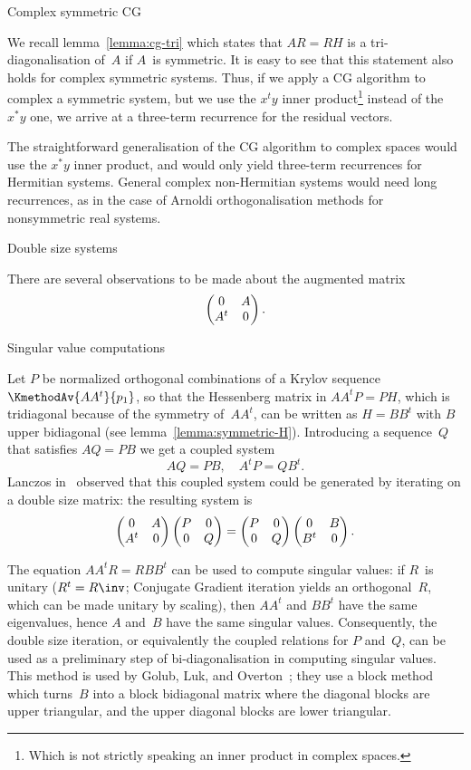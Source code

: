 \documentclass[11pt]{artikel3}
\begin{document}
\begin{Outline}
 {Complex symmetric CG}

We recall lemma~\ref{lemma:cg-tri} which states that $AR=RH$ is a
tri-diagonalisation of~$A$ if $A$~is symmetric. It is easy to see that
this statement also holds for complex symmetric systems. Thus, if we
apply a CG algorithm to complex a symmetric system, but we use the
$x^ty$ inner product\footnote{Which is not strictly speaking an inner
product in complex spaces.} instead of the $x^*y$ one, we arrive at a
three-term recurrence for the residual vectors. 

The straightforward generalisation of the CG algorithm to complex
spaces would use the $x^*y$ inner product, and would only yield
three-term recurrences for Hermitian systems. General complex
non-Hermitian systems would need long recurrences, as in the case of
Arnoldi orthogonalisation methods for nonsymmetric real systems.

 {Double size systems}

There are several observations to be made about the augmented matrix 
\[\begin{pmatrix}0&A\cr A^t&0\end{pmatrix}.\]

 {Singular value computations}\label{sec:svd}

Let $P$ be normalized orthogonal combinations of a Krylov sequence
$\KmethodAv{AA^t}{p_1}$, so that the Hessenberg matrix in
$AA^tP=PH$, which is tridiagonal because of the symmetry of~$AA^t$,
can be written as $H=BB^t$ with $B$ upper bidiagonal (see
lemma~\ref{lemma:symmetric-H}). Introducing a sequence~$Q$ that
satisfies $AQ=PB$ we get a coupled system
\[ AQ=PB,\quad A^tP=QB^t. \]
Lanczos in~\cite{La:differential-book} observed that this coupled
system could be generated by iterating on a double size matrix:
the resulting system is 
\[ \begin{pmatrix}0&A\cr A^t&0\end{pmatrix}\begin{pmatrix}P&0\cr 0&Q\end{pmatrix}=
    \begin{pmatrix}P&0\cr 0&Q\end{pmatrix}\begin{pmatrix}0&B\cr B^t&0\end{pmatrix}.\]

The equation $AA^tR=RBB^t$ can be used to compute singular values: if
$R$~is unitary ($R^t=R\inv$; Conjugate Gradient iteration yields an
orthogonal~$R$, which can be made unitary by scaling), then $AA^t$ and
$BB^t$ have the same eigenvalues, hence $A$ and~$B$ have the same
singular values.  Consequently, the double size iteration, or
equivalently the coupled relations for $P$ and~$Q$, can be used as a
preliminary step of bi-diagonalisation in computing singular values.
This method is used by Golub, Luk, and
Overton~\cite{GoLuOv:BlockLanczos}; they use a block method which
turns~$B$ into a block bidiagonal matrix where the diagonal blocks are
upper triangular, and the upper diagonal blocks are lower triangular.


\end{Outline}
\end{document}
